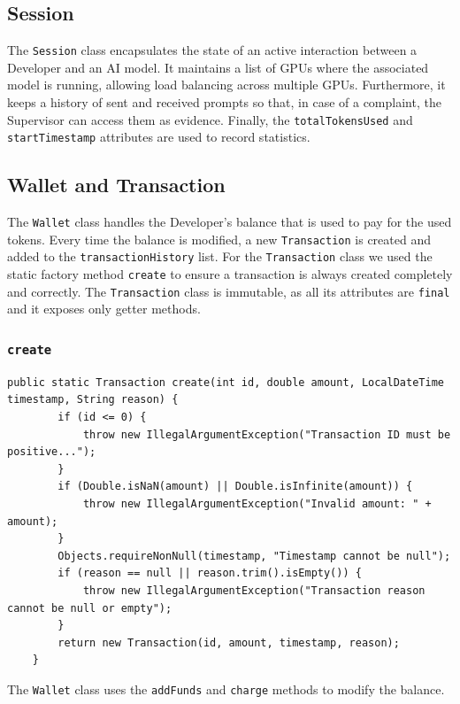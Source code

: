 \documentclass[a4paper,11pt]{report}
\begin{document}
	\subsection{Session}
	The \texttt{Session} class encapsulates the state of an active interaction between a Developer and an AI model.
	It maintains a list of GPUs where the associated model is running, allowing load balancing across multiple GPUs. 
	Furthermore, it keeps a history of sent and received prompts so that, in case of a complaint, the Supervisor can access them as evidence. 
	Finally, the \texttt{totalTokensUsed} and \texttt{startTimestamp} attributes are used to record statistics.
	
	\subsection{Wallet and Transaction}
	The \texttt{Wallet} class handles the Developer's balance that is used to pay for the used tokens. Every time the balance is modified, a new \texttt{Transaction} is created and added to the \texttt{transactionHistory} list.
	For the \texttt{Transaction} class we used the static factory method \texttt{create} to ensure a transaction is always created completely and correctly. The \texttt{Transaction} class is immutable, as all its attributes are \texttt{final} and it exposes only getter methods.
	
	\subsubsection{\texttt{create}}
	\begin{lstlisting}[label={lst:transactioncreate}]
	public static Transaction create(int id, double amount, LocalDateTime timestamp, String reason) {
		if (id <= 0) {
			throw new IllegalArgumentException("Transaction ID must be positive...");
		}
		if (Double.isNaN(amount) || Double.isInfinite(amount)) {
			throw new IllegalArgumentException("Invalid amount: " + amount);
		}
		Objects.requireNonNull(timestamp, "Timestamp cannot be null");
		if (reason == null || reason.trim().isEmpty()) {
			throw new IllegalArgumentException("Transaction reason cannot be null or empty");
		}
		return new Transaction(id, amount, timestamp, reason);
	}
	\end{lstlisting}
	
	The \texttt{Wallet} class uses the \texttt{addFunds} and \texttt{charge} methods to modify the balance. 
\end{document}
